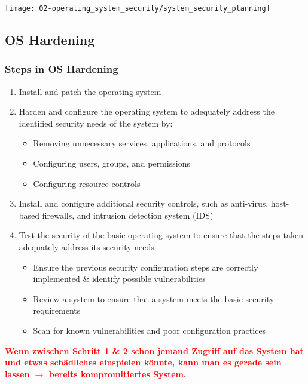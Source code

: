 \begin{center}
    \vspace{-8pt}
    \texttt{[image: 02-operating\_system\_security/system\_security\_planning]}
    \vspace{-8pt}
\end{center}

\subsection{OS Hardening}

\subsubsection{Steps in OS Hardening}
\begin{enumerate}
    \item Install and patch the operating system
    \item Harden and configure the operating system to adequately address the identified security needs of the system by:
    \begin{itemize}
        \item Removing unnecessary services, applications, and protocols
        \item Configuring users, groups, and permissions
        \item Configuring resource controls
    \end{itemize}
    \item Install and configure additional security controls, such as anti-virus, host-based firewalls, and intrusion detection system (IDS)
    \item Test the security of the basic operating system to ensure that the steps taken adequately address its security needs
    \begin{itemize}
        \item Ensure the previous security configuration steps are correctly implemented \& identify possible vulnerabilities
        \item Review a system to ensure that a system meets the basic security requirements
        \item Scan for known vulnerabilities and poor configuration practices\\
    \end{itemize}
\end{enumerate}

\textcolor{red}{\textbf{Wenn zwischen Schritt 1 \& 2 schon jemand Zugriff auf das System hat und etwas schädliches einspielen könnte, kann man es gerade sein lassen $\rightarrow$ bereits kompromitiertes System.}}

